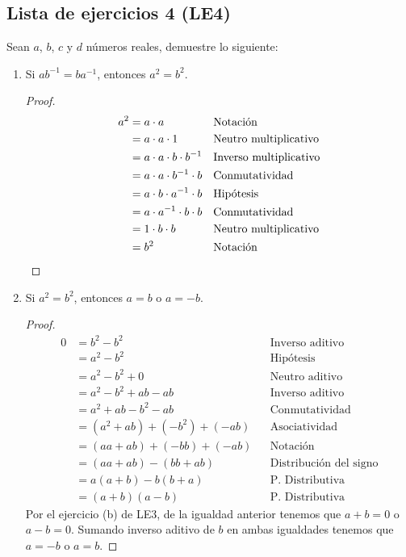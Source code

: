\documentclass[11pt]{article}
\begin{document}
\pagebreak

\subsection*{Lista de ejercicios 4 (LE4)}

Sean $a$, $b$, $c$ y $d$ números reales, demuestre lo siguiente:

\begin{enumerate}[label=\alph*)]
    \item Si $ab^{-1}=ba^{-1}$, entonces $a^2=b^2$.
    \vspace{-1em}\begin{proof} 
        \begin{align*}
            a^2 &= a\cdot a && \text{Notación}\\
            &= a\cdot a \cdot 1 && \text{Neutro multiplicativo}\\
            &= a\cdot a\cdot b\cdot b^{-1} && \text{Inverso multiplicativo}\\\
            &= a\cdot a\cdot b^{-1} \cdot b && \text{Conmutatividad}\\
            &= a\cdot b\cdot a^{-1} \cdot b && \text{Hipótesis}\\
            &= a\cdot a^{-1} \cdot b \cdot b&& \text{Conmutatividad}\\
            &= 1 \cdot b\cdot b && \text{Neutro multiplicativo}\\
            &= b^2 && \text{Notación} \qedhere
        \end{align*}
    \end{proof} \vspace{-1em}

    \item Si $a^2=b^2$, entonces $a=b$ o $a=-b$.
    \vspace{-1em}\begin{proof} 
        \begin{align*}
            0 &= b^2 - b^2 && \text{Inverso aditivo}\\
            &= a^2 - b^2 && \text{Hipótesis}\\
            &= a^2 - b^2 + 0&& \text{Neutro aditivo}\\
            &= a^2 - b^2 + ab-ab&& \text{Inverso aditivo}\\
            &= a^2 + a b - b^2 -ab && \text{Conmutatividad}\\
            &= (a^2 + a b) + (- b^2)+(-a b)&& \text{Asociatividad}\\
            &= (a a + a b) + (- b b)+(-a b)&& \text{Notación}\\
            &= (a a + a b) -(b b + a b)&& \text{Distribución del signo}\\
            &= a (a+b) - b(b+a) && \text{P. Distributiva}\\
            &= (a+b)  (a-b) && \text{P. Distributiva}
            \end{align*} Por el ejercicio (b) de LE3, de la igualdad anterior tenemos que $a+b=0$ o $a-b=0$. Sumando inverso aditivo de $b$ en ambas igualdades tenemos que $a=-b$ o $a=b$.
    \end{proof} \vspace{-1em}


\end{enumerate}
\end{document}
